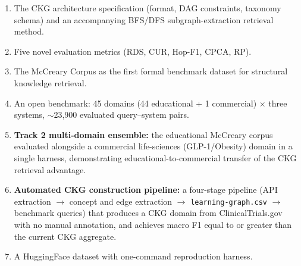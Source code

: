 \begin{enumerate}
  \item The CKG architecture specification (format, DAG constraints, taxonomy
    schema) and an accompanying BFS/DFS subgraph-extraction retrieval method.
  \item Five novel evaluation metrics (RDS, CUR, Hop-F1, CPCA, RP).
  \item The McCreary Corpus as the first formal benchmark dataset for
    structural knowledge retrieval.
  \item An open benchmark: 45 domains (44 educational + 1 commercial)
    $\times$ three systems, $\sim$23,900 evaluated query--system pairs.
  \item \textbf{Track 2 multi-domain ensemble:} the educational McCreary corpus
    evaluated alongside a commercial life-sciences (GLP-1/Obesity) domain in a
    single harness, demonstrating educational-to-commercial transfer of the
    CKG retrieval advantage.
  \item \textbf{Automated CKG construction pipeline:} a four-stage pipeline
    (API extraction $\to$ concept and edge extraction $\to$ \texttt{learning-graph.csv}
    $\to$ benchmark queries) that produces a CKG domain from
    ClinicalTrials.gov with no manual annotation, and achieves macro F1
    equal to or greater than the current CKG aggregate.
  \item A HuggingFace dataset with one-command reproduction harness.
\end{enumerate}
